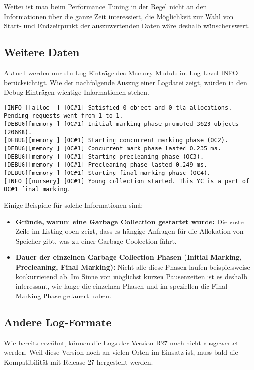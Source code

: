 Weiter ist man beim Performance Tuning in der Regel nicht an den Informationen über die ganze Zeit interessiert, die Möglichkeit zur Wahl von Start- und Endzeitpunkt der auszuwertenden Daten wäre deshalb wünschenswert.

\subsection{Weitere Daten}
Aktuell werden nur die Log-Einträge des Memory-Moduls im Log-Level INFO berücksichtigt. Wie der nachfolgende Auszug einer Logdatei zeigt, würden in den Debug-Einträgen wichtige Informationen stehen.

\begin{lstlisting}[caption=Garbage Collection Log (Debug Informationen)]
[INFO ][alloc  ] [OC#1] Satisfied 0 object and 0 tla allocations. Pending requests went from 1 to 1.
[DEBUG][memory ] [OC#1] Initial marking phase promoted 3620 objects (206KB).
[DEBUG][memory ] [OC#1] Starting concurrent marking phase (OC2).
[DEBUG][memory ] [OC#1] Concurrent mark phase lasted 0.235 ms.
[DEBUG][memory ] [OC#1] Starting precleaning phase (OC3).
[DEBUG][memory ] [OC#1] Precleaning phase lasted 0.249 ms.
[DEBUG][memory ] [OC#1] Starting final marking phase (OC4).
[INFO ][nursery] [OC#1] Young collection started. This YC is a part of OC#1 final marking.
\end{lstlisting}

Einige Beispiele für solche Informationen sind:
\begin{itemize}
	\item \textbf{Gründe, warum eine Garbage Collection gestartet wurde:  }Die erste Zeile im Listing oben zeigt, dass es hängige Anfragen für die Allokation von Speicher gibt, was zu einer Garbage Coolection führt.
	\item \textbf{Dauer der einzelnen Garbage Collection Phasen (Initial Marking, Precleaning, Final Marking): } Nicht alle diese Phasen laufen beispielsweise konkurrierend ab. Im Sinne von möglichst kurzen Pausenzeiten ist es deshalb interessant, wie lange die einzelnen Phasen und im speziellen die Final Marking Phase gedauert haben. 
\end{itemize}

\subsection{Andere Log-Formate}
Wie bereits erwähnt, können die Logs der Version R27 noch nicht ausgewertet werden. Weil diese Version noch an vielen Orten im Einsatz ist, muss bald die Kompatibilität mit Release 27 hergestellt werden.


